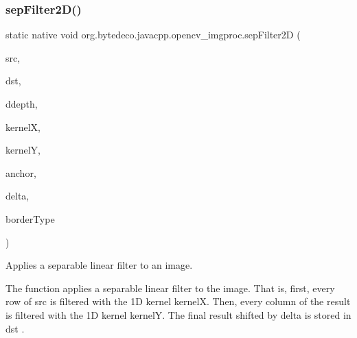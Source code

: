 \subsubsection{\texorpdfstring{sep\+Filter2\+D()}{sepFilter2D()}}
{\footnotesize\ttfamily static native void org.\+bytedeco.\+javacpp.\+opencv\+\_\+imgproc.\+sep\+Filter2D (\begin{DoxyParamCaption}\item[{@By\+Val Mat}]{src,  }\item[{@By\+Val Mat}]{dst,  }\item[{int}]{ddepth,  }\item[{@By\+Val Mat}]{kernelX,  }\item[{@By\+Val Mat}]{kernelY,  }\item[{@By\+Val(null\+Value=\char`\"{}cv\+::\+fr.antproject.utils.Point(-\/1,-\/1)\char`\"{}) fr.antproject.utils.Point}]{anchor,  }\item[{double}]{delta,  }\item[{int}]{border\+Type }\end{DoxyParamCaption})\hspace{0.3cm}{\ttfamily [static]}}



Applies a separable linear filter to an image. 

The function applies a separable linear filter to the image. That is, first, every row of src is filtered with the 1D kernel kernelX. Then, every column of the result is filtered with the 1D kernel kernelY. The final result shifted by delta is stored in dst . 


